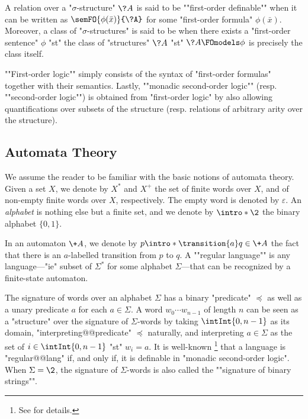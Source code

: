 A relation over a "$\sigma$-structure" $\?A$ is said to be
\AP""first-order definable"" when it can be written as
$\semFO{\phi(\bar x)}{\?A}$ for some "first-order formula" $\phi(\bar x)$.
Moreover, a class of "$\sigma$-structures" is said to be 
when there exists a "first-order sentence" $\phi$ "st" the class of "structures" $\?A$
"st" $\?A \FOmodels \phi$ is precisely the class itself.

\AP""First-order logic"" simply consists of the syntax of "first-order formulas" together
with their semantics. Lastly, \AP""monadic second-order logic""
(resp. ""second-order logic"") is obtained from "first-order logic"
by also allowing quantifications over subsets of the structure
(resp. relations of arbitrary arity over the structure).

\subsection{Automata Theory}

We assume the reader to be familiar with the basic notions of automata theory.
Given a set $X$, we denote by $X^*$ and $X^+$ the set of finite words
over $X$, and of non-empty finite words over $X$, respectively.
The empty word is denoted by $\varepsilon$.
An \emph{alphabet} is nothing else but a finite set, and we denote by
$\intro*\2$ the binary alphabet $\{0,1\}$.

In an automaton $\+A$, we denote by \AP $p \intro*\transition{a} q \in \+A$
the fact that there is an $a$-labelled transition from $p$ to $q$.
A \AP""regular language"" is any language---"ie" subset of $\Sigma^*$ for some alphabet $\Sigma$---that
can be recognized by a finite-state automaton.

The signature of words over an alphabet $\Sigma$ has a binary "predicate" $\preceq$
as well as a unary predicate $a$ for each $a\in \Sigma$.
A word $w_0 \cdots w_{n-1}$ of length $n$
can be seen as a "structure" over the signature of $\Sigma$-words
by taking $\intInt{0,n-1}$ as its domain, "interpreting@@predicate"
$\preceq$ naturally, and interpreting $a\in \Sigma$
as the set of $i \in \intInt{0,n-1}$ "st" $w_i = a$.
It is well-known%
\footnote{See  for details.}
that a language is "regular@@lang" if, and only if, it is definable in "monadic second-order logic".
When $\Sigma = \2$, the signature of $\Sigma$-words is also called 
the \AP""signature of binary strings"".

